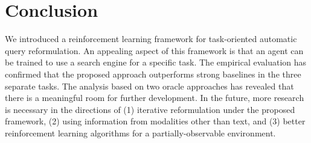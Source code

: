 \documentclass[11pt,letterpaper]{article}
\newcommand{\todo}[1]{{\Large\textcolor{red}{#1}}}
\begin{document}


\section{Conclusion}

We introduced a reinforcement learning framework for task-oriented automatic query reformulation. An appealing aspect of this framework is that an agent can be trained to use a search engine for a specific task. The empirical evaluation has confirmed that the proposed approach outperforms strong baselines in the three separate tasks. The analysis based on two oracle approaches has revealed that there is a meaningful room for further development. In the future, more research is necessary in the directions of (1) iterative reformulation under the proposed framework, (2) using information from modalities other than text, and (3) better reinforcement learning algorithms for a partially-observable environment.





\end{document}
